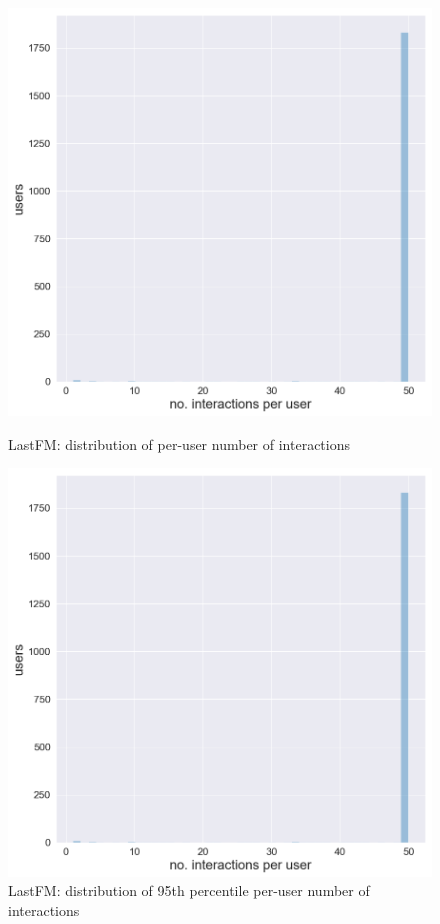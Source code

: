 \begin{figure}[htbp]
    \begin{minipage}{0.48\textwidth}
    \centering
      \includegraphics[width=\textwidth]{datasets/LastFM_user_interaction_distr.png}
      \caption{LastFM: distribution of per-user number of interactions}
      \label{fig:lastfm_dist}
    \end{minipage}
    \hfill
    \begin{minipage}{0.48\textwidth}
    \centering
     \includegraphics[width=\textwidth]{datasets/LastFM_95th_interaction_distr.png} 
     \caption{LastFM: distribution of 95th percentile per-user number of interactions}
      \label{fig:lastfm_dist_95}
    \end{minipage}
\end{figure}

